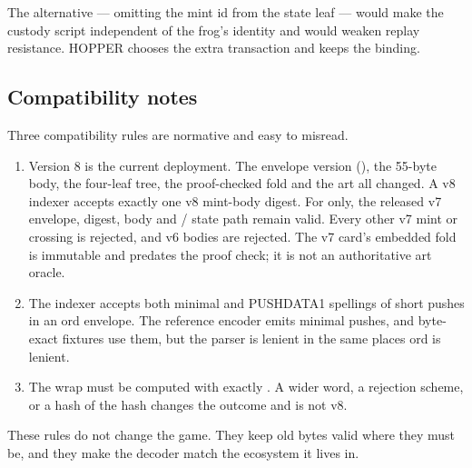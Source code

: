 The alternative --- omitting the mint id from the state leaf --- would make
the custody script independent of the frog's identity and would weaken
replay resistance. HOPPER chooses the extra transaction and keeps the binding.

\subsection{Compatibility notes}

Three compatibility rules are normative and easy to misread.

\begin{enumerate}[leftmargin=1.6em,itemsep=0.25em]
  \item Version 8 is the current deployment. The envelope version
        (), the 55-byte body, the four-leaf tree, the proof-checked
        fold and the art all changed. A v8 indexer accepts exactly one v8
        mint-body digest. For  only, the released v7
        envelope, digest,  body and /
        state path remain valid. Every other v7 mint or crossing is rejected,
        and v6 bodies are rejected. The v7 card's embedded fold is immutable
        and predates the proof check; it is not an authoritative art oracle.
  \item The indexer accepts both minimal and PUSHDATA1 spellings of short
        pushes in an ord envelope. The reference encoder emits minimal
        pushes, and byte-exact fixtures use them, but the parser is lenient
        in the same places ord is lenient.
  \item The wrap must be computed with exactly
        . A wider word, a rejection
        scheme, or a hash of the hash changes the outcome and is not v8.
\end{enumerate}

These rules do not change the game. They keep old bytes valid where they
must be, and they make the decoder match the ecosystem it lives in.
